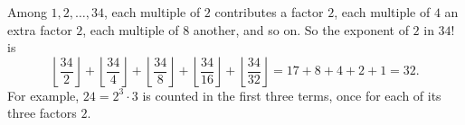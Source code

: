 Among $1,2,\ldots,34$, each multiple of $2$ contributes a factor $2$, each multiple of $4$ an extra factor $2$, each multiple of $8$ another, and so on. So the exponent of $2$ in $34!$ is
\[\left\lfloor\dfrac{34}{2}\right\rfloor+\left\lfloor\dfrac{34}{4}\right\rfloor+\left\lfloor\dfrac{34}{8}\right\rfloor+\left\lfloor\dfrac{34}{16}\right\rfloor+\left\lfloor\dfrac{34}{32}\right\rfloor=17+8+4+2+1=\boxed{32}.\]
For example, $24=2^3\cdot3$ is counted in the first three terms, once for each of its three factors $2$.
